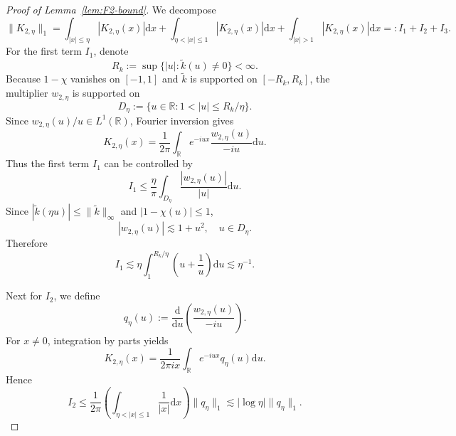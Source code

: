 \documentclass[english, 11pt]{article}
\newcommand{\mrd}{\mathrm{d}}
\newcommand{\FT}[1]{\widetilde{#1}}
\theoremstyle{plain}
\theoremstyle{definition}
\theoremstyle{remark}
\begin{document}
\begin{appendix}
\begin{proof}[Proof of Lemma~\ref{lem:F2-bound}]
We decompose
\begin{equation*}
\|K_{2,\eta}\|_1 = \int_{|x|\le \eta}|K_{2,\eta}(x)| \mrd x + \int_{\eta<|x|\le 1}|K_{2,\eta}(x)| \mrd x + \int_{|x|>1}|K_{2,\eta}(x)| \mrd x =: I_1+I_2+I_3.
\end{equation*}
For the first term $I_1$,
denote
\begin{equation*}
R_k:=\sup\{|u|:\FT{k}(u)\neq 0\}<\infty.
\end{equation*}
Because $1-\chi$ vanishes on $[-1,1]$ and $\FT{k}$ is supported on $[-R_k,R_k]$, the multiplier $w_{2,\eta}$ is supported on
\begin{equation*}
D_\eta:=\{u\in\mathbb R:1<|u|\le R_k/\eta\}.
\end{equation*}
Since $w_{2,\eta}(u)/u\in L^1(\mathbb R)$, Fourier inversion gives
\begin{equation*}
K_{2,\eta}(x) = \frac{1}{2\pi}\int_{\mathbb R} e^{-iux}\frac{w_{2,\eta}(u)}{-iu} \mrd u.
\end{equation*}
Thus the first term $I_1$ can be controlled by
\begin{equation*}
I_1\le\frac{\eta}{\pi}\int_{D_\eta}\frac{|w_{2,\eta}(u)|}{|u|} \mrd u.
\end{equation*}
Since $|\FT{k}(\eta u)|\le \|\FT{k}\|_\infty$ and $|1-\chi(u)|\le 1$,
\begin{equation*}
|w_{2,\eta}(u)|\lesssim 1+u^2,\quad u\in D_\eta.
\end{equation*}
Therefore
\begin{equation*}
I_1\lesssim \eta\int_1^{R_k/\eta}\left(u+\frac{1}{u}\right)\mrd u\lesssim \eta^{-1}.
\end{equation*}

Next for $I_2$, we define
\begin{equation*}
q_\eta(u):=\frac{\mrd}{\mrd u}\left(\frac{w_{2,\eta}(u)}{-iu}\right).
\end{equation*}
For $x\neq 0$, integration by parts yields
\begin{equation*}
K_{2,\eta}(x) = \frac{1}{2\pi i x}\int_{\mathbb R} e^{-iux} q_\eta(u) \mrd u.
\end{equation*}
Hence
\begin{equation*}
I_2\le\frac{1}{2\pi}\left(\int_{\eta<|x|\le 1}\frac{1}{|x|} \mrd x\right)\|q_\eta\|_1\lesssim |\log\eta| \|q_\eta\|_1.
\end{equation*}


\end{proof}
\end{appendix}
\end{document}
